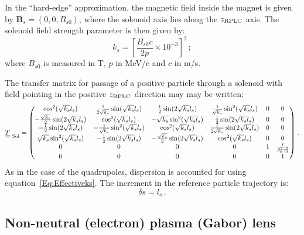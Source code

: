 In the ``hard-edge'' approximation, the magnetic field inside the
magnet is given by $\bm{B}_s = (0, 0, B_{s0})$, where the solenoid axis
lies along the $z_{\rm RPLC}$ axis.
The solenoid field strength parameter is then given by:
\begin{equation}
  k_s = \left[ \frac{B_{s0} c}{2p} \times 10^{-3} \right]^2\,;
  \label{Eq:Effectiveks}
\end{equation}
where $B_{s0}$ is measured in T, $p$ in MeV/c and $c$ in m/s.

The transfer matrix for passage of a positive particle through a
solenoid with field pointing in the positive $z_{\rm RPLC}$ direction
may may be written: 
\begin{equation}
  \underline{\underline{T}}_{\rm~Sol} =
    \begin{pmatrix}
                           \cos^2(\sqrt{k_s} l_s) &   \frac{1}{2\sqrt{k_s}} \sin(\sqrt{k_s} l_s) &           \frac{1}{2} \sin(2\sqrt{k_s} l_s) & \frac{1}{\sqrt{k_s}} \sin^2(\sqrt{k_s} l_s) & 0 & 0 \\
      -\frac{\sqrt{k_s}}{2} \sin(2\sqrt{k_s} l_s) &                       \cos^2(\sqrt{k_s} l_s) &           -\sqrt{k_s}\sin^2(\sqrt{k_s} l_s) &           \frac{1}{2} \sin(2\sqrt{k_s} l_s) & 0 & 0 \\
               -\frac{1}{2} \sin(2\sqrt{k_s} l_s) & -\frac{1}{\sqrt{k_s}} \sin^2(\sqrt{k_s} l_s) &                      \cos^2(\sqrt{k_s} l_s) & \frac{1}{2\sqrt{k_s}} \sin(2\sqrt{k_s} l_s) & 0 & 0 \\
                \sqrt{k_s} \sin^2(\sqrt{k_s} l_s) &           -\frac{1}{2} \sin(2\sqrt{k_s} l_s) & -\frac{\sqrt{k_s}}{2} \sin(2\sqrt{k_s} l_s) &                      \cos^2(\sqrt{k_s} l_s) & 0 & 0 \\
          0 & 0 & 0 & 0 & 1 & \frac{l}{\beta_0^2 \gamma_0^2} \\
          0 & 0 & 0 & 0 & 0 &                             1
        \end{pmatrix} \, .
\end{equation}
As in the case of the quadrupoles, dispersion is accounted for using
equation~\ref{Eq:Effectiveks}.
The increment in the reference particle trajectory is:
\begin{equation}
  \delta s = l_s \, .
\end{equation}

\subsection{Non-neutral (electron) plasma (Gabor) lens}

